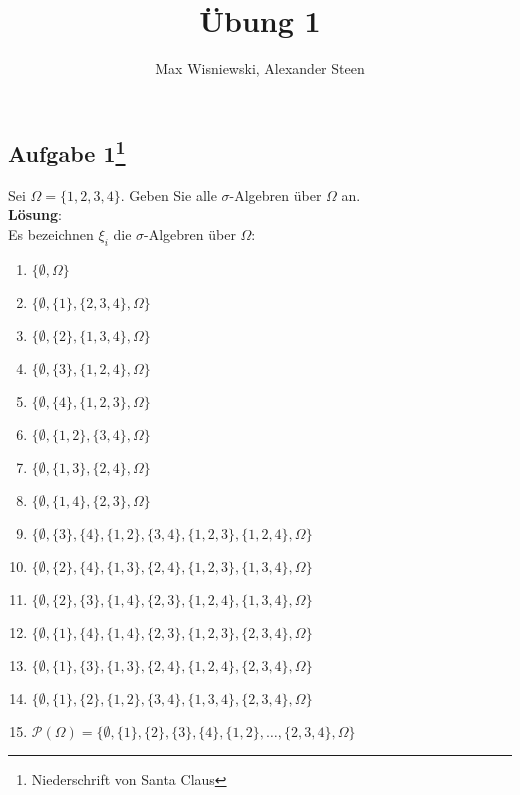 \documentclass[11pt,a4paper,ngerman]{article}
\date{}
\title{Übung 1}
\author{Max Wisniewski, Alexander Steen}
\newcommand{\set}[1]{ \{ #1 \}}
\begin{document}

\renewcommand{\figurename}{Figure}

\maketitle
\thispagestyle{fancy}


\subsection*{Aufgabe 1\footnote{Niederschrift von Santa Claus}}
Sei $\Omega = \{1,2,3,4\}$. Geben Sie alle $\sigma$-Algebren über $\Omega$ an. \\

\textbf{Lösung}: \\
Es bezeichnen $\xi_i$ die $\sigma$-Algebren über $\Omega$:
\begin{enumerate}[$\xi_1 = $]
\item $\{\emptyset, \Omega \}$
\item $\set{\emptyset, \set{1}, \set{2,3,4}, \Omega}$
\item $\set{\emptyset, \set{2}, \set{1,3,4},\Omega}$
\item $\set{\emptyset, \set{3}, \set{1,2,4},\Omega}$
\item $\set{\emptyset, \set{4}, \set{1,2,3},\Omega}$
\item $\{\emptyset, \set{1,2}, \set{3,4}, \Omega \}$
\item $\{\emptyset, \set{1,3}, \set{2,4}, \Omega \}$
\item $\{\emptyset, \set{1,4}, \set{2,3}, \Omega \}$
\item $\{\emptyset, \set{3}, \set{4}, \set{1,2}, \set{3,4}, \set{1,2,3}, \set{1,2,4}, \Omega \}$
\item $\{\emptyset, \set{2}, \set{4}, \set{1,3}, \set{2,4}, \set{1,2,3}, \set{1,3,4}, \Omega \}$
\item $\{\emptyset, \set{2}, \set{3}, \set{1,4}, \set{2,3}, \set{1,2,4}, \set{1,3,4}, \Omega \}$
\item $\{\emptyset, \set{1}, \set{4}, \set{1,4}, \set{2,3}, \set{1,2,3}, \set{2,3,4}, \Omega \}$
\item $\{\emptyset, \set{1}, \set{3}, \set{1,3}, \set{2,4}, \set{1,2,4}, \set{2,3,4}, \Omega \}$
\item $\{\emptyset, \set{1}, \set{2}, \set{1,2}, \set{3,4}, \set{1,3,4}, \set{2,3,4}, \Omega \}$
\item $\mathcal{P}(\Omega) = \{\emptyset, \set{1},\set{2},\set{3}, \set{4}, \set{1,2}, \ldots, \set{2,3,4}, \Omega \}$
\end{enumerate}
\end{document}
